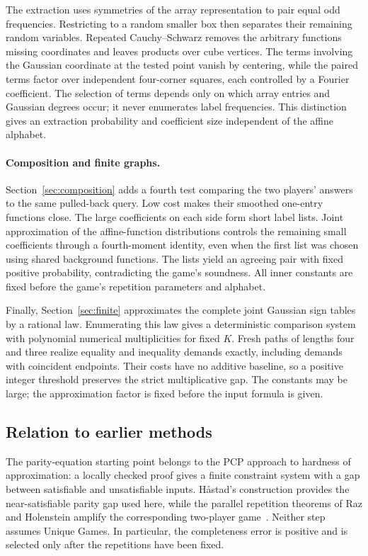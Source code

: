 The extraction uses symmetries of the array representation to pair equal
odd frequencies. Restricting to a random smaller box then separates their
remaining random variables. Repeated Cauchy--Schwarz removes the arbitrary
functions missing coordinates and leaves products over cube vertices.
The terms involving the Gaussian coordinate at the tested point vanish by
centering, while the paired terms factor over independent four-corner
squares, each controlled by a Fourier coefficient. The selection of terms depends only on which
array entries and Gaussian degrees occur; it never enumerates label
frequencies. This distinction gives an extraction probability and
coefficient size independent of the affine alphabet.

\paragraph{Composition and finite graphs.}
Section~\ref{sec:composition} adds a fourth test comparing the two players'
answers to the same pulled-back query. Low cost makes their smoothed
one-entry functions close. The large coefficients on each side form short
label lists. Joint approximation of the affine-function distributions
controls the remaining small coefficients through a fourth-moment
identity, even when the first list was chosen using shared background
functions. The lists yield an agreeing pair with fixed positive probability,
contradicting the game's soundness. All inner constants are fixed before
the game's repetition parameters and alphabet.

Finally, Section~\ref{sec:finite} approximates the complete joint Gaussian
sign tables by a rational law. Enumerating this law gives a deterministic
comparison system with polynomial numerical multiplicities for fixed $K$.
Fresh paths of lengths four and three realize equality and inequality
demands exactly, including demands with coincident endpoints. Their costs
have no additive baseline, so a positive integer threshold preserves the
strict multiplicative gap. The constants may be large; the approximation
factor is fixed before the input formula is given.

\subsection{Relation to earlier methods}

The parity-equation starting point belongs to the PCP approach to hardness
of approximation: a locally checked proof gives a finite constraint system
with a gap between satisfiable and unsatisfiable inputs. H\aa stad's
construction provides the near-satisfiable parity gap used here, while the
parallel repetition theorems of Raz and Holenstein amplify the
corresponding two-player game~\cite{Hastad2001,Raz1998,Holenstein2009}.
Neither step assumes Unique Games. In particular, the completeness error
is positive and is selected only after the repetitions have been fixed.

